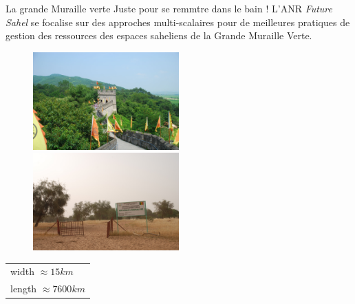 \documentclass[newPxFont]{beamer}
\newcommand{\tabitem}{%
  \usebeamertemplate{itemize item}\hspace*{\labelsep}}
\begin{document}
\begin{frame}[c]{La grande Muraille verte}
\vspace{-1cm}
Juste pour se remmtre dans le bain ! L'ANR \textit{Future Sahel} se focalise sur des  approches multi-scalaires pour de meilleures pratiques de gestion des ressources des espaces saheliens de la Grande Muraille Verte.
\begin{figure}
	\centering
	\includegraphics[width = 0.5\textwidth]{img/great_wall}
  \includegraphics[width = 0.5\textwidth]{img/GMV_widou}
\end{figure}
\begin{center}
    \begin{tabular}{@{}l@{}}
       \\
      \tabitem width $\approx 15 km$ \\
      \tabitem length $\approx 7600km$
  \end{tabular}
\end{center}
\end{frame}
\end{document}
